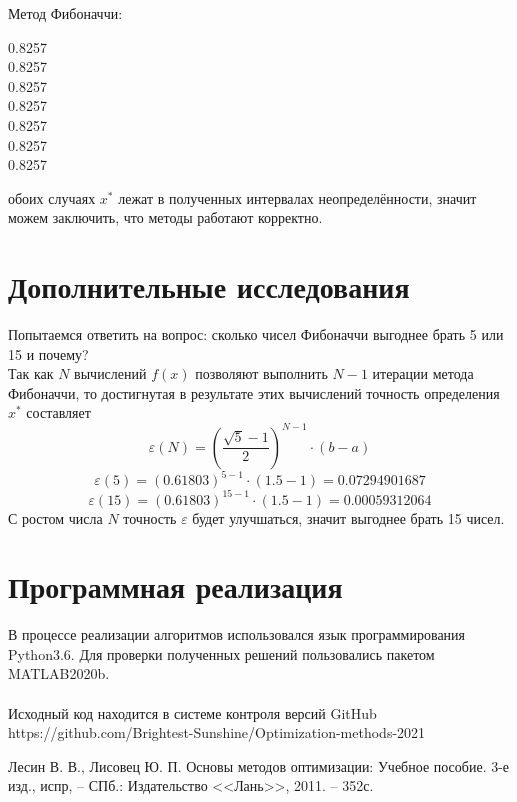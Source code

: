 \documentclass{article}
\begin{document}
Метод Фибоначчи:
\begin{center}
0.8257 \in [0.5, 1]\\
0.8257 \in [0.6904761904761905, 1]\\
0.8257 \in [0.6904761904761905, 0.8809523809523809]\\
0.8257 \in [0.7619047619047619, 0.8809523809523809]\\
0.8257 \in [0.8095238095238095, 0.8809523809523809]\\
0.8257 \in [0.8095238095238095, 0.8571428571428571]\\
0.8257 \in  [0.8333333333333333, 0.8571428571428571]\\
\end{center}

 обоих случаях $x^{*}$ лежат в полученных интервалах неопределённости, значит можем заключить, что методы работают корректно.

\section{Дополнительные исследования}
\noindent Попытаемся ответить на вопрос: сколько чисел Фибоначчи выгоднее брать 5 или 15 и почему?\\
Так как $N$ вычислений $f(x)$ позволяют выполнить $N-1$ итерации метода Фибоначчи, то достигнутая в результате этих вычислений точность определения $x^{*}$ составляет
$$\varepsilon(N)=(\frac{\sqrt{5}-1}{2})^{N-1}\cdot (b-a)$$
$$\varepsilon(5)=(0.61803)^{5-1}\cdot (1.5-1)=0.07294901687$$
$$\varepsilon(15)=(0.61803)^{15-1}\cdot (1.5-1)=0.00059312064$$
С ростом числа $N$ точность $\varepsilon$ будет улучшаться, значит выгоднее брать 15 чисел.



\section{Программная реализация}
\noindent В процессе реализации алгоритмов использовался язык программирования Python3.6. Для проверки полученных решений пользовались пакетом MATLAB2020b.
\\\\
\noindent Исходный код находится в системе контроля версий GitHub 
\\
https://github.com/Brightest-Sunshine/Optimization-methods-2021

\begin{thebibliography}{9}
 Лесин В. В., Лисовец Ю. П. Основы методов оптимизации: Учебное пособие. 3-е изд., испр, -- СПб.: Издательство <<Лань>>, 2011. -- 352с.

\end{thebibliography}
\end{document}
